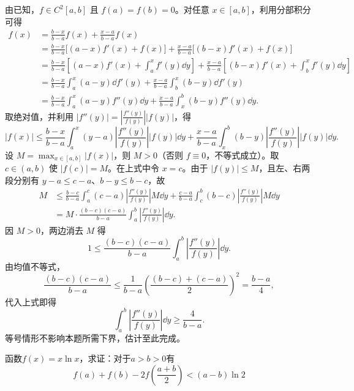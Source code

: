 \begin{solution}
    由已知，$f\in C^2[a,b]$ 且 $f(a)=f(b)=0$。对任意 $x\in[a,b]$，利用分部积分可得
    \begin{align*}
        f(x) &= \frac{b-x}{b-a} f(x) + \frac{x-a}{b-a} f(x) \\
             &= \frac{b-x}{b-a} \bigl[(a-x)f'(x)+f(x)\bigr] 
                + \frac{x-a}{b-a} \bigl[(b-x)f'(x)+f(x)\bigr] \\
             &= \frac{b-x}{b-a} \left[(a-x)f'(x)+\int_a^x f'(y)\dd y\right] 
                + \frac{x-a}{b-a} \left[(b-x)f'(x)+\int_b^x f'(y)\dd y\right] \\
             &= \frac{b-x}{b-a} \int_a^x (a-y)\dd f'(y) 
                + \frac{x-a}{b-a} \int_b^x (b-y)\dd f'(y) \\
             &= \frac{b-x}{b-a} \int_a^x (a-y)f''(y)\dd y 
                + \frac{x-a}{b-a} \int_x^b (b-y)f''(y)\dd y.
    \end{align*}
    取绝对值，并利用 $\displaystyle |f''(y)| = \left|\frac{f''(y)}{f(y)}\right| |f(y)|$，得
    \[
    |f(x)| \le \frac{b-x}{b-a} \int_a^x (y-a) \left|\frac{f''(y)}{f(y)}\right| |f(y)| \dd y 
           + \frac{x-a}{b-a} \int_x^b (b-y) \left|\frac{f''(y)}{f(y)}\right| |f(y)| \dd y.
    \]
    设 $\displaystyle M = \max_{x\in[a,b]} |f(x)|$，则 $M>0$（否则 $f\equiv0$，不等式成立）。取 $c\in(a,b)$ 使 $|f(c)|=M$。在上式中令 $x=c$。由于 $|f(y)|\le M$，且左、右两段分别有 $y-a\le c-a$、$b-y\le b-c$，故
    \begin{align*}
        M &\le \frac{b-c}{b-a} \int_a^c (c-a) \left|\frac{f''(y)}{f(y)}\right| M \dd y 
           + \frac{c-a}{b-a} \int_c^b (b-c) \left|\frac{f''(y)}{f(y)}\right| M \dd y \\
          &= M \cdot \frac{(b-c)(c-a)}{b-a} \int_a^b \left|\frac{f''(y)}{f(y)}\right| \dd y.
    \end{align*}
    因 $M>0$，两边消去 $M$ 得
    \[
    1 \le \frac{(b-c)(c-a)}{b-a} \int_a^b \left|\frac{f''(y)}{f(y)}\right| \dd y.
    \]
    由均值不等式，
    \[
    \frac{(b-c)(c-a)}{b-a} \le \frac{1}{b-a} \left( \frac{(b-c)+(c-a)}{2} \right)^2 = \frac{b-a}{4},
    \]
    代入上式即得
    \[
    \int_a^b \left|\frac{f''(y)}{f(y)}\right| \dd y \ge \frac{4}{b-a}.
    \]
    等号情形不影响本题所需下界，估计至此完成。
\end{solution}
\newpage
\begin{example}[（2004年全国II卷）]
    函数$f(x)=x\ln x$，求证：对于$a>b>0$有
    \[f(a)+f(b)-2f\left(\frac{a+b}{2}\right)<(a-b)\ln 2\]
\end{example}
